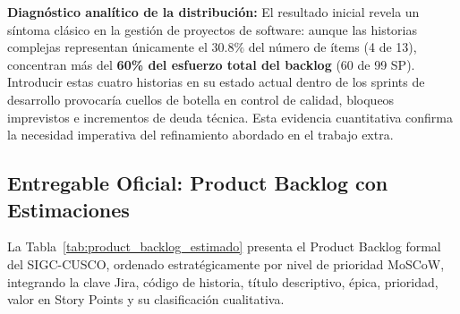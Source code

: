 \textbf{Diagnóstico analítico de la distribución:}
El resultado inicial revela un síntoma clásico en la gestión de proyectos de software: aunque las historias complejas representan únicamente el $30.8\%$ del número de ítems (4 de 13), concentran más del \textbf{60\% del esfuerzo total del backlog} (60 de 99 SP). Introducir estas cuatro historias en su estado actual dentro de los sprints de desarrollo provocaría cuellos de botella en control de calidad, bloqueos imprevistos e incrementos de deuda técnica. Esta evidencia cuantitativa confirma la necesidad imperativa del refinamiento abordado en el trabajo extra.

\subsection{Entregable Oficial: Product Backlog con Estimaciones}

La Tabla~\ref{tab:product_backlog_estimado} presenta el Product Backlog formal del SIGC-CUSCO, ordenado estratégicamente por nivel de prioridad MoSCoW, integrando la clave Jira, código de historia, título descriptivo, épica, prioridad, valor en Story Points y su clasificación cualitativa.

